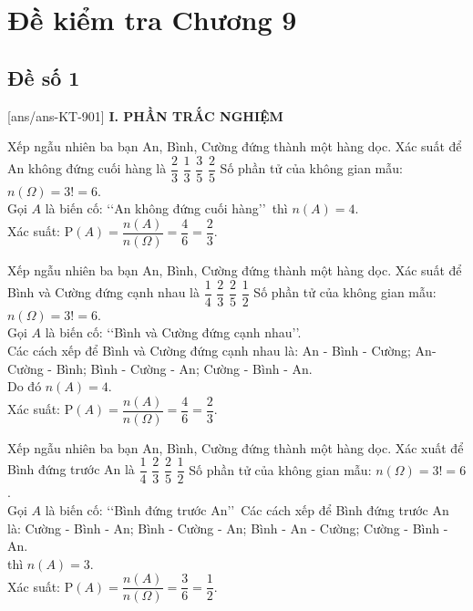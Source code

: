 \section*{Đề kiểm tra Chương 9}
\subsection*{Đề số 1}
\setcounter{ex}{0}\setcounter{bt}{0}
[ans/ans-KT-901]
\noindent\textbf{I. PHẦN TRẮC NGHIỆM}
\begin{ex}%
	Xếp ngẫu nhiên ba bạn An, Bình, Cường đứng thành một hàng dọc. Xác suất để An không đứng cuối hàng là
	\choice
	{\True $\dfrac{2}{3}$}
	{$\dfrac{1}{3}$}
	{$\dfrac{3}{5}$}
	{$\dfrac{2}{5}$}	
	\loigiai
	{
		Số phần tử của không gian mẫu: $n(\Omega)=3!=6$.\\
		Gọi $A$ là biến cố: \lq\lq  An không đứng cuối hàng\rq\rq \, thì $n(A)=4$.\\
		Xác suất: $\mathrm{P}(A)=\dfrac{n(A)}{n(\Omega)} =\dfrac{4}{6}=\dfrac{2}{3}$.
	}
\end{ex}
\begin{ex}%
	Xếp ngẫu nhiên ba bạn An, Bình, Cường đứng thành một hàng dọc. Xác suất để Bình và Cường đứng cạnh nhau là
	\choice
	{$\dfrac{1}{4}$}
	{\True $\dfrac{2}{3}$}
	{$\dfrac{2}{5}$}
	{$\dfrac{1}{2}$}
	\loigiai
	{
		Số phần tử của không gian mẫu: $n(\Omega)=3!=6$.\\
		Gọi $A$ là biến cố: \lq\lq  Bình và Cường đứng cạnh nhau\rq\rq. \\
		Các cách xếp để Bình và Cường đứng cạnh nhau là: An - Bình - Cường; An- Cường - Bình; Bình - Cường - An; Cường - Bình - An.\\
		Do đó  $n(A)=4$.\\
		Xác suất: $\mathrm{P}(A)=\dfrac{n(A)}{n(\Omega)} =\dfrac{4}{6}=\dfrac{2}{3}$.		
	}
\end{ex}
\begin{ex}%
	Xếp ngẫu nhiên ba bạn An, Bình, Cường đứng thành một hàng dọc. Xác xuất để Bình đứng trước An là
	\choice
	{$\dfrac{1}{4}$}
	{\True $\dfrac{2}{3}$}
	{$\dfrac{2}{5}$}
	{$\dfrac{1}{2}$}
	\loigiai
	{
		Số phần tử của không gian mẫu: $n(\Omega)=3!=6$.\\
		Gọi $A$ là biến cố: \lq\lq  Bình đứng trước An\rq\rq \, 
		Các cách xếp để Bình đứng trước An là: Cường - Bình - An; Bình - Cường - An; Bình - An - Cường; Cường - Bình - An.\\
		thì $n(A)=3$.\\
		Xác suất: $\mathrm{P}(A)=\dfrac{n(A)}{n(\Omega)} =\dfrac{3}{6}=\dfrac{1}{2}$.			
	}
\end{ex}
